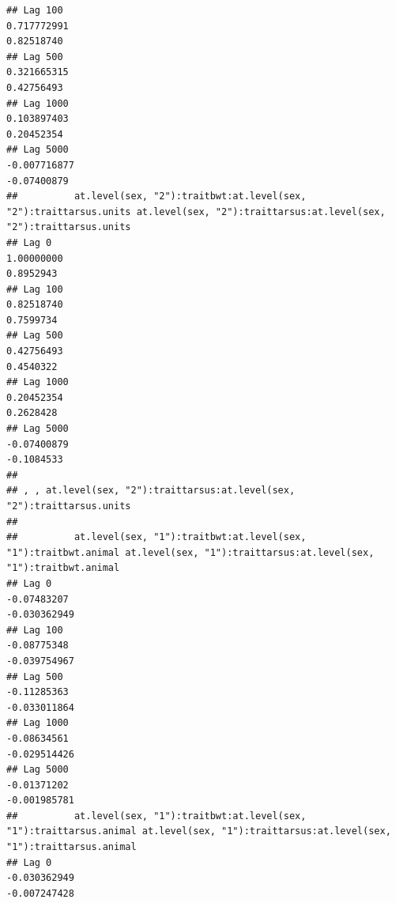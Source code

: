 \documentclass[
  12pt,
]{book}
\begin{document}
\begin{verbatim}
## Lag 100                                                    0.717772991                                                       0.82518740
## Lag 500                                                    0.321665315                                                       0.42756493
## Lag 1000                                                   0.103897403                                                       0.20452354
## Lag 5000                                                  -0.007716877                                                      -0.07400879
##          at.level(sex, "2"):traitbwt:at.level(sex, "2"):traittarsus.units at.level(sex, "2"):traittarsus:at.level(sex, "2"):traittarsus.units
## Lag 0                                                          1.00000000                                                           0.8952943
## Lag 100                                                        0.82518740                                                           0.7599734
## Lag 500                                                        0.42756493                                                           0.4540322
## Lag 1000                                                       0.20452354                                                           0.2628428
## Lag 5000                                                      -0.07400879                                                          -0.1084533
## 
## , , at.level(sex, "2"):traittarsus:at.level(sex, "2"):traittarsus.units
## 
##          at.level(sex, "1"):traitbwt:at.level(sex, "1"):traitbwt.animal at.level(sex, "1"):traittarsus:at.level(sex, "1"):traitbwt.animal
## Lag 0                                                       -0.07483207                                                      -0.030362949
## Lag 100                                                     -0.08775348                                                      -0.039754967
## Lag 500                                                     -0.11285363                                                      -0.033011864
## Lag 1000                                                    -0.08634561                                                      -0.029514426
## Lag 5000                                                    -0.01371202                                                      -0.001985781
##          at.level(sex, "1"):traitbwt:at.level(sex, "1"):traittarsus.animal at.level(sex, "1"):traittarsus:at.level(sex, "1"):traittarsus.animal
## Lag 0                                                         -0.030362949                                                         -0.007247428

\end{verbatim}
\end{document}
